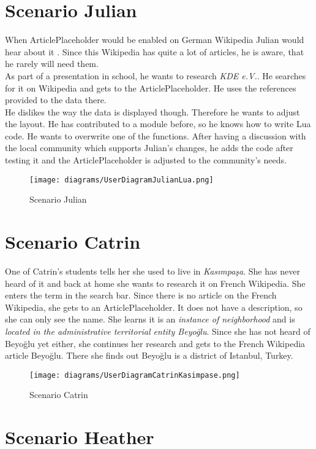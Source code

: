 \section{Scenario Julian}
When ArticlePlaceholder would be enabled on German Wikipedia Julian would hear about it . Since this Wikipedia has quite a lot of articles, he is aware, that he rarely will need them. \\
As part of a presentation in school, he wants to research \textit{KDE e.V.}. He searches for it on Wikipedia and gets to the ArticlePlaceholder. He uses the references provided to the data there. \\
He dislikes the way the data is displayed though. Therefore he wants to adjust the layout. He has contributed to a module before, so he knows how to write Lua code. He wants to overwrite one of the functions. After having a discussion with the local community which supports Julian's changes, he adds the code after testing it and the ArticlePlaceholder is adjusted to the community's needs. 
\begin{figure}[H]
	\centering
	\texttt{[image: diagrams/UserDiagramJulianLua.png]}
	\caption{Scenario Julian}
	\label{fig:ScenarioJulian}
\end{figure}

\section{Scenario Catrin}
One of Catrin's students tells her she used to live in \textit{Kasımpaşa}. She has never heard of it and back at home she wants to research it on French Wikipedia. She enters the term in the search bar. Since there is no article on the French Wikipedia, she gets to an ArticlePlaceholder. It does not have a description, so she can only see the name. She learns it is an \textit{instance of neighborhood} and is \textit{located in the administrative territorial entity Beyoğlu}. Since she has not heard of Beyoğlu yet either, she continues her research and gets to the French Wikipedia article Beyoğlu. There she finds out Beyoğlu is a district of Istanbul, Turkey.
\begin{figure}[H]
	\centering
	\texttt{[image: diagrams/UserDiagramCatrinKasimpase.png]}
	\caption{Scenario Catrin}
	\label{fig:ScenarioCartin}
\end{figure}

\section{Scenario Heather}

